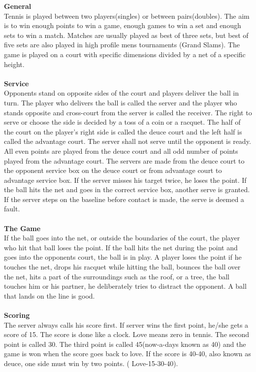 \documentclass[10pt]{report}
\begin{document}
{\bf General}\\
Tennis is played between two players(singles) or between pairs(doubles).
The aim is to win enough points to win a game, enough games to win
a set and enough sets to win a match. Matches are usually played as best of three
sets, but best of five sets are also played in high profile mens tournaments (Grand
Slams). 
The game is played on a court with specific dimensions divided by a net of a specific height.\\
\\
{\bf Service} \\
Opponents stand on opposite sides of the court and players deliver the ball in turn.
The player who delivers the ball is called the server and the player who stands opposite and cross-court from the server
is called the receiver. 
The right to serve or choose the side is decided by a toss of a coin or a racquet.
The half of the court on the player's right side is called the deuce court and the left half is called the advantage court. 
The server shall not serve until the opponent is ready. All even points are played from the deuce court and 
all odd number of points played from the advantage court. The servers are made from the deuce court to the opponent service box
on the deuce court or from advantage court to advantage service box. If the server misses his target twice, he loses the point. 
If the ball hits the net and goes in the correct service box, another serve is granted. If the server steps on the baseline before contact is made, 
the serve is deemed a fault. \\
\\
{\bf The Game} \\
If the ball goes into the net, or outside the boundaries of the court, the player who hit that ball loses the point. If the ball hits the net during the point and goes into the opponents court, the ball is in play. A player loses the point if he touches the net, drops his racquet while hitting the ball, bounces the ball over the net, hits a part of the surroundings such as the roof, or a tree, the ball touches him or his partner, he deliberately tries to distract the opponent.
A ball that lands on the line is good.\\
\\
{\bf Scoring} \\
The server always calls his score first. If server wins the first point, he/she gets a score of 15. The score is done like a clock. Love means zero in tennis.
The second point is called 30. The third point is called 45(now-a-days known as 40) and the game is won when the score goes back to love. If the score is 40-40, 
also known as deuce, one side must win by two points. ( Love-15-30-40). \\ 
\end{document}
